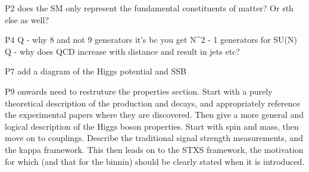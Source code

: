 P2
does the SM only represent the fundamental constituents of matter? Or sth else as well?

P4
Q - why 8 and not 9 generators it's bc you get N^2 - 1 generators for SU(N)
Q - why does QCD increase with distance and result in jets etc?

P7
add a diagram of the Higgs potential and SSB

P9 onwards
need to restruture the properties section. 
Start with a purely theoretical description of the production and decays, 
and appropriately reference the experimental papers where they are discovered.
Then give a more general and logical description of the Higgs boson properties. 
Start with spin and mass, then move on to couplings. 
Describe the traditional signal strength measurements, and the kappa framework. 
This then leads on to the STXS framework, 
the motivation for which (and that for the binnin) should be clearly stated when it is introduced. 
